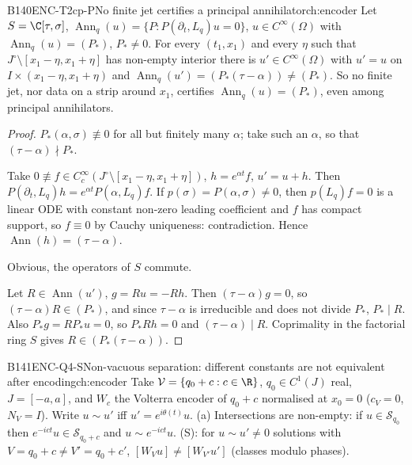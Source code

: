 \begin{dimcard}{B140}{ENC-T2cp-P}{No finite jet certifies a principal annihilator}{\pw}{ch:encoder}
Let $S=\C[\tau,\sigma]$, $\operatorname{Ann}_q(u)=\{P:P(\partial_t,L_q)u=0\}$, $u\in C^\infty(\Omega)$ with $\operatorname{Ann}_q(u)=(P_*)$, $P_*\ne0$. For every $(t_1,x_1)$ and every $\eta$ such that $J^\circ\setminus[x_1-\eta,x_1+\eta]$ has non-empty interior there is $u'\in C^\infty(\Omega)$ with $u'=u$ on $I\times(x_1-\eta,x_1+\eta)$ and $\operatorname{Ann}_q(u')=(P_*(\tau-\alpha))\ne(P_*)$. So no finite jet, nor data on a strip around $x_1$, certifies $\operatorname{Ann}_q(u)=(P_*)$, even among principal annihilators.
\end{dimcard}

\begin{proof}
$P_*(\alpha,\sigma)\not\equiv0$ for all but finitely many $\alpha$; take such an $\alpha$, so that $(\tau-\alpha)\nmid P_*$.

Take $0\not\equiv f\in C_c^\infty(J^\circ\setminus[x_1-\eta,x_1+\eta])$, $h=e^{\alpha t}f$, $u'=u+h$. Then $P(\partial_t,L_q)h=e^{\alpha t}P(\alpha,L_q)f$. If $p(\sigma)=P(\alpha,\sigma)\ne0$, then $p(L_q)f=0$ is a linear ODE with constant non-zero leading coefficient and $f$ has compact support, so $f\equiv0$ by Cauchy uniqueness: contradiction. Hence $\operatorname{Ann}(h)=(\tau-\alpha)$.

Obvious, the operators of $S$ commute.

Let $R\in\operatorname{Ann}(u')$, $g=Ru=-Rh$. Then $(\tau-\alpha)g=0$, so $(\tau-\alpha)R\in(P_*)$, and since $\tau-\alpha$ is irreducible and does not divide $P_*$, $P_*\mid R$. Also $P_*g=RP_*u=0$, so $P_*Rh=0$ and $(\tau-\alpha)\mid R$. Coprimality in the factorial ring $S$ gives $R\in(P_*(\tau-\alpha))$.

\end{proof}

\begin{dimcard}{B141}{ENC-Q4-S}{Non-vacuous separation: different constants are not equivalent after encoding}{\pw}{ch:encoder}
Take $\mathcal V=\{q_0+c:c\in\R\}$, $q_0\in C^1(J)$ real, $J=[-a,a]$, and $W_c$ the Volterra encoder of $q_0+c$ normalised at $x_0=0$ ($c_V=0$, $N_V=I$). Write $u\sim u'$ iff $u'=e^{i\theta(t)}u$. (a) Intersections are non-empty: if $u\in\mathcal S_{q_0}$ then $e^{-ict}u\in\mathcal S_{q_0+c}$ and $u\sim e^{-ict}u$. (S): for $u\sim u'\ne0$ solutions with $V=q_0+c\ne V'=q_0+c'$, $[W_Vu]\ne[W_{V'}u']$ (classes modulo phases).
\end{dimcard}


